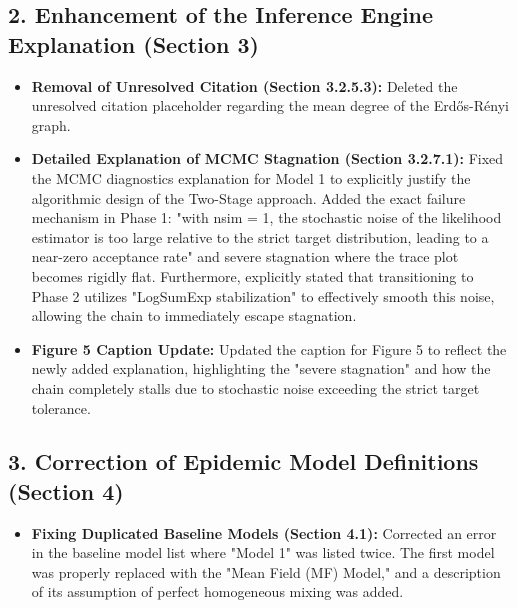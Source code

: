 \subsection*{2. Enhancement of the Inference Engine Explanation (Section 3)}
\begin{itemize}
    \item \textbf{Removal of Unresolved Citation (Section 3.2.5.3):} Deleted the unresolved citation placeholder regarding the mean degree of the Erd\H{o}s-R\'{e}nyi graph.
    \item \textbf{Detailed Explanation of MCMC Stagnation (Section 3.2.7.1):} Fixed the MCMC diagnostics explanation for Model 1 to explicitly justify the algorithmic design of the Two-Stage approach.
    Added the exact failure mechanism in Phase 1: "with nsim = 1, the stochastic noise of the likelihood estimator is too large relative to the strict target distribution, leading to a near-zero acceptance rate" and severe stagnation where the trace plot becomes rigidly flat.
    Furthermore, explicitly stated that transitioning to Phase 2 utilizes "LogSumExp stabilization" to effectively smooth this noise, allowing the chain to immediately escape stagnation.
    \item \textbf{Figure 5 Caption Update:} Updated the caption for Figure 5 to reflect the newly added explanation, highlighting the "severe stagnation" and how the chain completely stalls due to stochastic noise exceeding the strict target tolerance.
\end{itemize}

\subsection*{3. Correction of Epidemic Model Definitions (Section 4)}
\begin{itemize}
    \item \textbf{Fixing Duplicated Baseline Models (Section 4.1):} Corrected an error in the baseline model list where "Model 1" was listed twice. The first model was properly replaced with the "Mean Field (MF) Model," and a description of its assumption of perfect homogeneous mixing was added.
\end{itemize}


